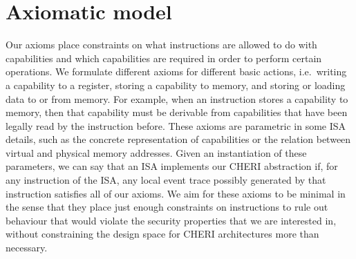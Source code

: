 \documentclass[11pt]{article}
\theoremstyle{definition}
\begin{document}
% 
% 
% 
% 
% 
%   







\section{Axiomatic model}
\label{sec:axiomatic-model}

Our axioms place constraints on what instructions are allowed to do with capabilities and which
capabilities are required in order to perform certain operations.
We formulate different axioms for different basic actions, i.e.~writing a capability to a register, storing a capability to memory, and storing or loading data to or from memory.
For example, when an instruction stores a capability to memory, then that capability must be derivable from capabilities that have been legally read by the instruction before.
These axioms are parametric in some ISA details, such as the concrete
representation of capabilities or the relation between virtual and physical
memory addresses.  Given an instantiation of these parameters, we can say that
an ISA implements our CHERI abstraction if, for any instruction of the ISA, any local event trace possibly
generated by that instruction satisfies all of our axioms.
We aim for these axioms to be minimal in the sense that they place just enough
constraints on instructions to rule out behaviour that would violate the security
properties that we are interested in, without constraining the design space for
CHERI architectures more than necessary.  %
\end{document}
